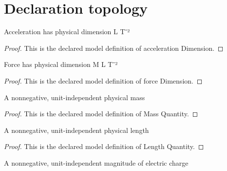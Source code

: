 \section{Declaration topology}
\begin{definition}
  \label{def:physics:phyx-mini-0902:phyxminiproblems-problemphyxmini0902-accelerationdimension}
  Acceleration has physical dimension L T⁻²
\end{definition}
\begin{proof}
  This is the declared model definition of acceleration Dimension.
\end{proof}
\begin{definition}
  \label{def:physics:phyx-mini-0902:phyxminiproblems-problemphyxmini0902-forcedimension}
  Force has physical dimension M L T⁻²
\end{definition}
\begin{proof}
  This is the declared model definition of force Dimension.
\end{proof}
\begin{definition}
  \label{def:physics:phyx-mini-0902:phyxminiproblems-problemphyxmini0902-massquantity}
  A nonnegative, unit-independent physical mass
\end{definition}
\begin{proof}
  This is the declared model definition of Mass Quantity.
\end{proof}
\begin{definition}
  \label{def:physics:phyx-mini-0902:phyxminiproblems-problemphyxmini0902-lengthquantity}
  A nonnegative, unit-independent physical length
\end{definition}
\begin{proof}
  This is the declared model definition of Length Quantity.
\end{proof}
\begin{definition}
  \label{def:physics:phyx-mini-0902:phyxminiproblems-problemphyxmini0902-chargemagnitudequantity}
  A nonnegative, unit-independent magnitude of electric charge
\end{definition}
